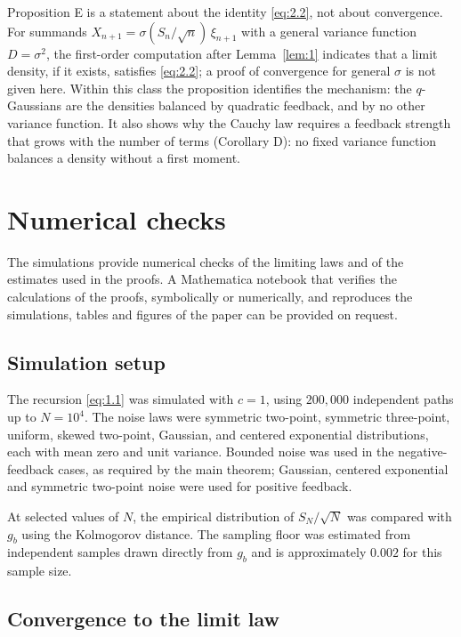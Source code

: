 \documentclass[aip,jmp,preprint,onecolumn,floatfix,superscriptaddress,nofootinbib,11pt]{revtex4-2}
\theoremstyle{plain}
\theoremstyle{remark}
\numberwithin{equation}{section}
\begin{document}
Proposition E is a statement about the identity \eqref{eq:2.2}, not about convergence. For summands $X_{n+1}=\sigma(S_n/\sqrt n)\,\xi_{n+1}$ with a general variance function $D=\sigma^{2}$, the first-order computation after Lemma~\ref{lem:1} indicates that a limit density, if it exists, satisfies \eqref{eq:2.2}; a proof of convergence for general $\sigma$ is not given here. Within this class the proposition identifies the mechanism: the $q$-Gaussians are the densities balanced by quadratic feedback, and by no other variance function. It also shows why the Cauchy law requires a feedback strength that grows with the number of terms (Corollary D): no fixed variance function balances a density without a first moment.

\section{Numerical checks}\label{app:num}

The simulations provide numerical checks of the limiting laws and of the estimates used in the proofs. A Mathematica notebook that verifies the calculations of the proofs, symbolically or numerically, and reproduces the simulations, tables and figures of the paper can be provided on request.

\subsection{Simulation setup}\label{sec:6_1}

The recursion \eqref{eq:1.1} was simulated with $c=1$, using $200{,}000$ independent paths up to $N=10^{4}$. The noise laws were symmetric two-point, symmetric three-point, uniform, skewed two-point, Gaussian, and centered exponential distributions, each with mean zero and unit variance. Bounded noise was used in the negative-feedback cases, as required by the main theorem; Gaussian, centered exponential and symmetric two-point noise were used for positive feedback.

At selected values of $N$, the empirical distribution of $S_N/\sqrt N$ was compared with $g_b$ using the Kolmogorov distance. The sampling floor was estimated from independent samples drawn directly from $g_b$ and is approximately $0.002$ for this sample size.

\subsection{Convergence to the limit law}\label{sec:6_2}
\end{document}
